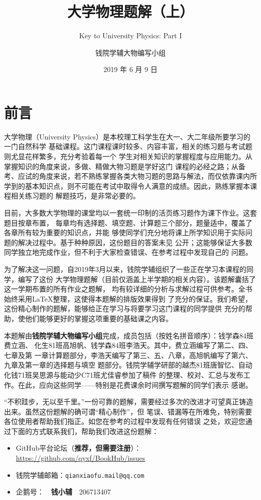 \documentclass[b5paper,opensource,sourcefont,parskip]{qyxf-book}
\title{大学物理题解（上）}
\subtitle{Key to University Physics: Part I}
\author{钱院学辅大物编写小组}
\date{2019 年 6 月 9 日}
\begin{document}
\maketitle

\pagestyle{plain}
\chapter*{前言}
大学物理（University Physics）是本校理工科学生在大一、大二年级所要学习的一门自然科学
基础课程。这门课程课时较多、内容丰富，相关的练习题与考试题则尤显花样繁多，充分考验着每一个
学生对相关知识的掌握程度与应用能力。从掌握知识的角度来说，多做、精做大物习题是学好这门
课程的必经之路；从备考、应试的角度来说，若不熟练掌握各类大物习题的思路与解法，而仅依靠课内所
学到的基本知识点，则不可能在考试中取得令人满意的成绩。因此，熟练掌握本课程相关练习题的
解题技巧，是非常必要的。

目前，大多数大学物理的课堂均以一套统一印制的活页练习题作为课下作业。这套题目按章布置，
每章均有选择题、填空题、计算题三个部分，题量适中，覆盖了各章所有较为重要的知识点，并能
够使同学们充分地将课上所学知识用于实际问题的解决过程中。基于种种原因，这份题目的答案未见
公开；这能够保证大多数同学独立地完成作业，但不利于大家检查错误、在参考过程中发现自己的
问题。

为了解决这一问题，自2019年3月以来，钱院学辅组织了一些正在学习本课程的同学，编写了这份
大学物理题解（目前仅涵盖上半学期的相关内容）。该题解囊括了这一学期布置的所有作业之题解，
均有较详细的分析与求解过程可供参考。全书始终采用\LaTeX 整理，这使得本题解的排版效果得到
了充分的保证。我们希望，这份精心制作的题解，能够给正在学习与将要学习这门课程的同学提供
充分的帮助，使他们能够更好的掌握这项重要的基础课之内容。

本题解由\textbf{钱院学辅大物编写小组}完成，成员包括（按姓名拼音顺序）：钱学森84班费立涵、
化生81班高旭帆、钱学森84班李浩天。其中，费立涵编写了第二、四、七章及第
一章计算题部分，李浩天编写了第三、五、八章，高旭帆编写了第六、九章及第一章的选择题与填空
题部分。钱院学辅学研部的越杰81班唐智忆、自动化钱71班吴思源与能动少C71班尤佳睿参加了稿件
的整理、校对、汇总与发布工作。在此，应向这些同学——特别是花费课余时间撰写题解的同学们表示
感谢。

“不积跬步，无以至千里。”一份可靠的题解，需要经过多次的改进才可望真正铸造出来。虽然这份题解的确可谓“精心制作”，但
笔误、错漏等在所难免，特别需要各位使用者帮助我们指正。如您在参考的过程中发现有任何错误
之处，欢迎您通过下面的方式联系我们，帮助我们改进这份题解：
\begin{itemize}
	\item GitHub平台论坛（\textbf{推荐，但需要注册}）：\url{https://github.com/qyxf/BookHub/issues}
	\item 钱院学辅邮箱：\texttt{qianxiaofu.mail@qq.com}
	\item 企鹅号：~~\textbf{钱小辅}~~206713407
\end{itemize}
\end{document}
